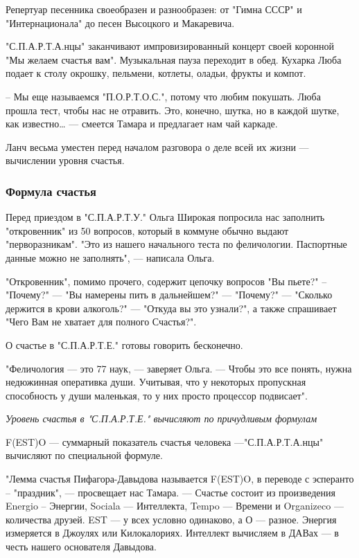 Репертуар песенника своеобразен и разнообразен: от "Гимна СССР" и
"Интернационала" до песен Высоцкого и Макаревича.

"С.П.А.Р.Т.А.нцы" заканчивают импровизированный концерт своей коронной "Мы
желаем счастья вам". Музыкальная пауза переходит в обед. Кухарка Люба подает к
столу окрошку, пельмени, котлеты, оладьи, фрукты и компот.

– Мы еще называемся "П.О.Р.Т.О.С.", потому что любим покушать. Люба прошла
тест, чтобы нас не отравить. Это, конечно, шутка, но в каждой шутке, как
известно… --- смеется Тамара и предлагает нам чай каркаде.

Ланч весьма уместен перед началом разговора о деле всей их жизни --- вычислении
уровня счастья.

\subsubsection{Формула счастья}

Перед приездом в "С.П.А.Р.Т.У." Ольга Широкая попросила нас заполнить
"откровенник" из 50 вопросов, который в коммуне обычно выдают "перворазникам".
"Это из нашего начального теста по феличологии. Паспортные данные можно не
заполнять", --- написала Ольга.

"Откровенник", помимо прочего, содержит цепочку вопросов "Вы пьете?" –
"Почему?" --- "Вы намерены пить в дальнейшем?" --- "Почему?" --- "Сколько держится в
крови алкоголь?" --- "Откуда вы это узнали?", а также спрашивает "Чего Вам не
хватает для полного Счастья?". 

О счастье в "С.П.А.Р.Т.Е." готовы говорить бесконечно.

"Феличология --- это 77 наук, --- заверяет Ольга. --- Чтобы это все понять, нужна
недюжинная оперативка души. Учитывая, что у некоторых пропускная способность у
души маленькая, то у них просто процессор подвисает".

{\em
Уровень счастья в "С.П.А.Р.Т.Е." вычисляют по причудливым формулам
\/}

F(EST)O --- суммарный показатель счастья человека —"С.П.А.Р.Т.А.нцы" вычисляют по
специальной формуле.

"Лемма счастья Пифагора-Давыдова называется F(EST)O, в переводе с эсперанто  –
"праздник", --- просвещает нас Тамара. --- Счастье состоит из произведения Energio
– Энергии, Sociala --- Интеллекта, Tempo --- Времени и Organizeco --- количества
друзей. EST --- у всех условно одинаково, а О --- разное. Энергия измеряется в
Джоулях или Килокалориях. Интеллект вычисляем в ДАВах --- в честь нашего
основателя Давыдова. 

